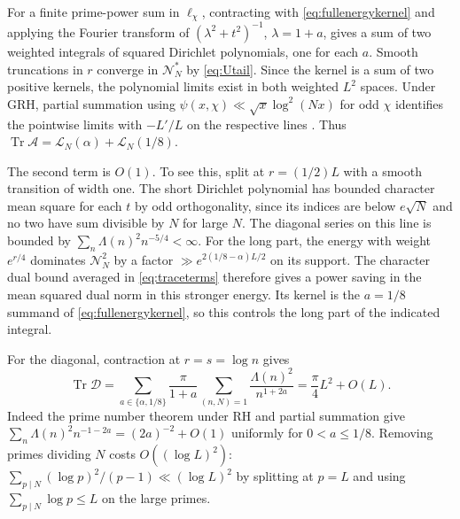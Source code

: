 \documentclass[11pt,a4paper]{article}
\numberwithin{equation}{section}
\newcommand{\NN}{\mathcal N_N}
\begin{document}
For a finite prime-power sum in $\ell_\chi$, contracting
with \cref{eq:fullenergykernel} and applying the Fourier
transform of $(\lambda^2+t^2)^{-1}$, $\lambda=1+a$,
gives a sum of two weighted integrals of squared Dirichlet
polynomials, one for each $a$. Smooth truncations in
$r$ converge in $\NN^*$ by \cref{eq:Utail}. Since the
kernel is a sum of two positive kernels, the polynomial
limits exist in both weighted $L^2$ spaces. Under GRH,
partial summation using $\psi(x,\chi)\ll \sqrt x\log^2(Nx)$
for odd $\chi$ identifies the pointwise limits with
$-L'/L$ on the respective lines \cite[Section~4]{LeeGRH}.
Thus $\operatorname{Tr}\mathcal A=\mathcal L_N(\alpha)+
\mathcal L_N(1/8)$.

The second term is $O(1)$. To see this, split at
$r=(1/2)L$ with a smooth transition of width one.
The short Dirichlet polynomial has bounded character
mean square for each $t$ by odd orthogonality, since its
indices are below $e\sqrt N$ and no two have sum divisible
by $N$ for large $N$. The diagonal series on this line
is bounded by $\sum_n\Lambda(n)^2 n^{-5/4}<\infty$.
For the long part, the energy with weight $e^{r/4}$
dominates $\NN^2$ by a factor $\gg e^{2(1/8-\alpha)L/2}$
on its support. The character dual bound averaged in
\cref{eq:traceterms} therefore gives a power saving in the
mean squared dual norm in this stronger energy. Its kernel
is the $a=1/8$ summand of \cref{eq:fullenergykernel}, so
this controls the long part of the indicated integral.

For the diagonal, contraction at $r=s=\log n$ gives
\[
 \operatorname{Tr}\mathcal D
    =\sum_{a\in\{\alpha,1/8\}}\frac{\pi}{1+a}
        \sum_{(n,N)=1}\frac{\Lambda(n)^2}{n^{1+2a}}
    =\frac{\pi}{4}L^2+O(L).
\]
Indeed the prime number theorem under RH and partial
summation give $\sum_n\Lambda(n)^2 n^{-1-2a}
=(2a)^{-2}+O(1)$ uniformly for $0<a\le1/8$. Removing
primes dividing $N$ costs $O((\log L)^2)$:
$\sum_{p\mid N}(\log p)^2/(p-1)\ll(\log L)^2$ by
splitting at $p=L$ and using $\sum_{p\mid N}\log p\le L$
on the large primes.
\end{document}
